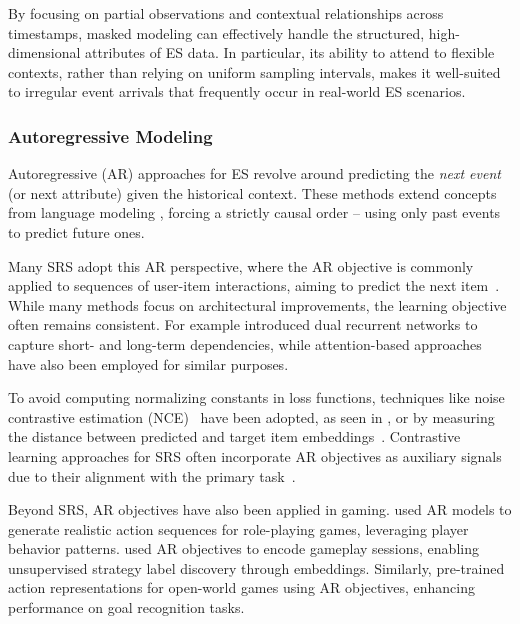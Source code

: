 \documentclass[twoside,11pt]{article}
\begin{document}
By focusing on partial observations and contextual relationships across timestamps, masked modeling can effectively handle the structured, high-dimensional attributes of ES data. In particular, its ability to attend to flexible contexts, rather than relying on uniform sampling intervals, makes it well-suited to irregular event arrivals that frequently occur in real-world ES scenarios.

\subsubsection{Autoregressive Modeling}
\label{subsubsec:ar-modeling}
Autoregressive (AR) approaches for ES revolve around predicting the {\it next event} (or next attribute) given the historical context. These methods extend concepts from language modeling , forcing a strictly causal order -- using only past events to predict future ones.

Many SRS adopt this AR perspective, where the AR objective is commonly applied to sequences of user-item interactions, aiming to predict the next item~. While many methods focus on architectural improvements, the learning objective often remains consistent. For example  introduced dual recurrent networks to capture short- and long-term dependencies, while attention-based approaches~ have also been employed for similar purposes.

To avoid computing normalizing constants in loss functions, techniques like noise contrastive estimation (NCE)~ have been adopted, as seen in , or by measuring the distance between predicted and target item embeddings~. Contrastive learning approaches for SRS often incorporate AR objectives as auxiliary signals due to their alignment with the primary task~.

Beyond SRS, AR objectives have also been applied in gaming.  used AR models to generate realistic action sequences for role-playing games, leveraging player behavior patterns.  used AR objectives to encode gameplay sessions, enabling unsupervised strategy label discovery through embeddings. Similarly,  pre-trained action representations for open-world games using AR objectives, enhancing performance on goal recognition tasks.
\end{document}
